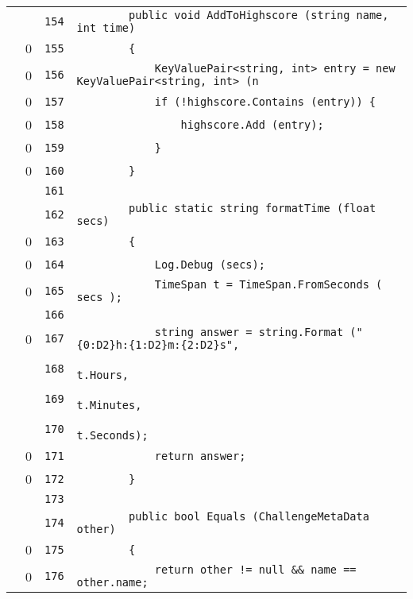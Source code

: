 \documentclass[a4paper,10pt]{article}
\begin{document}
\begin{longtable}[l]{lrrl}
\cellcolor{gray} &  & \verb~154~ & \verb~        public void AddToHighscore (string name, int time)~\\
\cellcolor{red} & 0 & \verb~155~ & \verb~        {~\\
\cellcolor{red} & 0 & \verb~156~ & \verb~            KeyValuePair<string, int> entry = new KeyValuePair<string, int> (n~\\
\cellcolor{red} & 0 & \verb~157~ & \verb~            if (!highscore.Contains (entry)) {~\\
\cellcolor{red} & 0 & \verb~158~ & \verb~                highscore.Add (entry);~\\
\cellcolor{red} & 0 & \verb~159~ & \verb~            }~\\
\cellcolor{red} & 0 & \verb~160~ & \verb~        }~\\
\cellcolor{gray} &  & \verb~161~ & \verb~~\\
\cellcolor{gray} &  & \verb~162~ & \verb~        public static string formatTime (float secs)~\\
\cellcolor{red} & 0 & \verb~163~ & \verb~        {~\\
\cellcolor{red} & 0 & \verb~164~ & \verb~            Log.Debug (secs);~\\
\cellcolor{red} & 0 & \verb~165~ & \verb~            TimeSpan t = TimeSpan.FromSeconds ( secs );~\\
\cellcolor{gray} &  & \verb~166~ & \verb~~\\
\cellcolor{red} & 0 & \verb~167~ & \verb~            string answer = string.Format ("{0:D2}h:{1:D2}m:{2:D2}s",~\\
\cellcolor{gray} &  & \verb~168~ & \verb~                                           t.Hours,~\\
\cellcolor{gray} &  & \verb~169~ & \verb~                                           t.Minutes,~\\
\cellcolor{gray} &  & \verb~170~ & \verb~                                           t.Seconds);~\\
\cellcolor{red} & 0 & \verb~171~ & \verb~            return answer;~\\
\cellcolor{red} & 0 & \verb~172~ & \verb~        }~\\
\cellcolor{gray} &  & \verb~173~ & \verb~~\\
\cellcolor{gray} &  & \verb~174~ & \verb~        public bool Equals (ChallengeMetaData other)~\\
\cellcolor{red} & 0 & \verb~175~ & \verb~        {~\\
\cellcolor{red} & 0 & \verb~176~ & \verb~            return other != null && name == other.name;~\\

\end{longtable}
\end{document}

